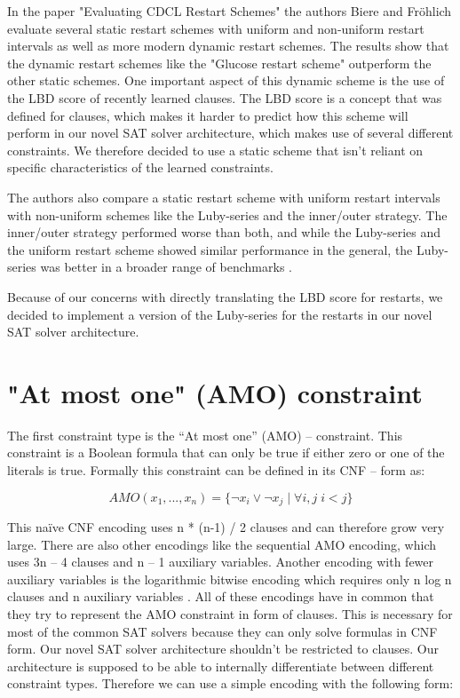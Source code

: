 In the paper "Evaluating CDCL Restart Schemes" \cite{biere2015evaluatingRestarts} the authors Biere and Fröhlich evaluate several static restart schemes with uniform and non-uniform restart intervals as well as more modern dynamic restart schemes. The results show that the dynamic restart schemes like the "Glucose restart scheme" \cite{biere2015evaluatingRestarts} outperform the other static schemes. One important aspect of this dynamic scheme is the use of the LBD score of recently learned clauses. The LBD score is a concept that was defined for clauses, which makes it harder to predict how this scheme will perform in our novel SAT solver architecture, which makes use of several different constraints. We therefore decided to use a static scheme that isn't reliant on specific characteristics of the learned constraints.

The authors also compare a static restart scheme with uniform restart intervals with non-uniform schemes like the Luby-series and the inner/outer strategy. The inner/outer strategy performed worse than both, and while the Luby-series and the uniform restart scheme showed similar performance in the general, the Luby-series was better in a broader range of benchmarks \cite{biere2015evaluatingRestarts}.

Because of our concerns with directly translating the LBD score for restarts, we decided to implement a version of the Luby-series for the restarts in our novel SAT solver architecture.

\section{"At most one" (AMO) constraint}
\label{sec:AMOConstraint}

The first constraint type is the “At most one” (AMO) – constraint. This constraint is a Boolean formula that can only be true if either zero or one of the literals is true.  Formally this constraint can be defined in its CNF – form as:

\begin{leftbar}
\begin{displaymath}
AMO(x_1, ..., x_n)= \{\neg x_i \vee \neg x_j \; | \; \forall i, j \; i < j\}
\end{displaymath}
\end{leftbar}

This naïve CNF encoding uses n * (n-1) / 2 clauses and can therefore grow very large. There are also other encodings like the sequential AMO encoding, which uses 3n – 4 clauses and n – 1 auxiliary variables. Another encoding with fewer auxiliary variables is the logarithmic bitwise encoding which requires only n log n clauses and n auxiliary variables \cite{chen2010new}. All of these encodings have in common that they try to represent the AMO constraint in form of clauses. This is necessary for most of the common SAT solvers because they can only solve formulas in CNF form. Our novel SAT solver architecture shouldn’t be restricted to clauses. Our architecture is supposed to be able to internally differentiate between different constraint types. Therefore we can use a simple encoding with the following form:

